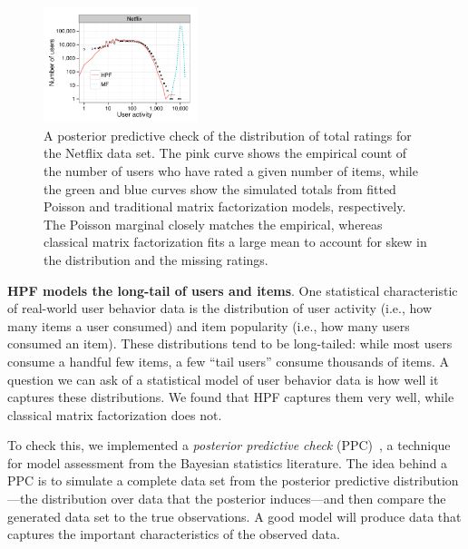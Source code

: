 \begin{figure}[t!]
  \centering
  \includegraphics[width=0.4\textwidth]{figures/user_activity_sim_netflix.pdf}
  \caption{A posterior predictive check of the distribution of total
    ratings for the Netflix data set.  The pink curve shows the
    empirical count of the number of users who have rated a given
    number of items, while the green and blue curves show the
    simulated totals from fitted Poisson and traditional matrix
    factorization models, respectively. The Poisson marginal closely
    matches the empirical, whereas classical matrix factorization fits
    a large mean to account for skew in the distribution and the
    missing ratings.}
\label{fig:marginals}
\end{figure}

{\bf HPF models the long-tail of users and items}.  One statistical
characteristic of real-world user behavior data is the distribution of
user activity (i.e., how many items a user consumed) and item
popularity (i.e., how many users consumed an item).  These
distributions tend to be long-tailed: while most users consume a
handful few items, a few ``tail users'' consume thousands of items.  A
question we can ask of a statistical model of user behavior data is
how well it captures these distributions.  We found that HPF captures
them very well, while classical matrix factorization does not.

To check this, we implemented a \textit{posterior predictive check}
(PPC)~\cite{Rubin:1984,Gelman:1996}, a technique for model assessment
from the Bayesian statistics literature.  The idea behind a PPC is to
simulate a complete data set from the posterior predictive
distribution---the distribution over data that the posterior
induces---and then compare the generated data set to the true
observations. A good model will produce data that captures the
important characteristics of the observed data.


